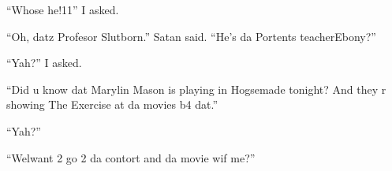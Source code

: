\enquote{Whose he!11} I asked.

\enquote{Oh, datz Profesor Slutborn.} Satan said. \enquote{He's da Portents teacher\dotfill Ebony?}

\enquote{Yah?} I asked.

\enquote{Did u know dat Marylin Mason is playing in Hogsemade to\-night? And they r showing The Exercise at da movies b4 dat.}

\enquote{Yah?}

\enquote{Wel\dotfill want 2 go 2 da contort and da movie wif me?}
